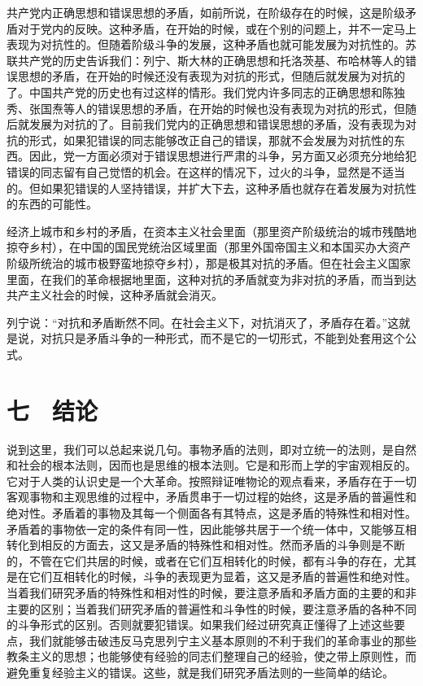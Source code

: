 共产党内正确思想和错误思想的矛盾，如前所说，在阶级存在的时候，这是阶级矛盾对于党内的反映。这种矛盾，在开始的时候，或在个别的问题上，并不一定马上表现为对抗性的。但随着阶级斗争的发展，这种矛盾也就可能发展为对抗性的。苏联共产党的历史告诉我们：列宁、斯大林的正确思想和托洛茨基、布哈林等人的错误思想的矛盾，在开始的时候还没有表现为对抗的形式，但随后就发展为对抗的了。中国共产党的历史也有过这样的情形。我们党内许多同志的正确思想和陈独秀、张国焘等人的错误思想的矛盾，在开始的时候也没有表现为对抗的形式，但随后就发展为对抗的了。目前我们党内的正确思想和错误思想的矛盾，没有表现为对抗的形式，如果犯错误的同志能够改正自己的错误，那就不会发展为对抗性的东西。因此，党一方面必须对于错误思想进行严肃的斗争，另方面又必须充分地给犯错误的同志留有自己觉悟的机会。在这样的情况下，过火的斗争，显然是不适当的。但如果犯错误的人坚持错误，并扩大下去，这种矛盾也就存在着发展为对抗性的东西的可能性。

经济上城市和乡村的矛盾，在资本主义社会里面（那里资产阶级统治的城市残酷地掠夺乡村），在中国的国民党统治区域里面（那里外国帝国主义和本国买办大资产阶级所统治的城市极野蛮地掠夺乡村），那是极其对抗的矛盾。但在社会主义国家里面，在我们的革命根据地里面，这种对抗的矛盾就变为非对抗的矛盾，而当到达共产主义社会的时候，这种矛盾就会消灭。

列宁说：“对抗和矛盾断然不同。在社会主义下，对抗消灭了，矛盾存在着。”这就是说，对抗只是矛盾斗争的一种形式，而不是它的一切形式，不能到处套用这个公式。

\section{七　结论}

说到这里，我们可以总起来说几句。事物矛盾的法则，即对立统一的法则，是自然和社会的根本法则，因而也是思维的根本法则。它是和形而上学的宇宙观相反的。它对于人类的认识史是一个大革命。按照辩证唯物论的观点看来，矛盾存在于一切客观事物和主观思维的过程中，矛盾贯串于一切过程的始终，这是矛盾的普遍性和绝对性。矛盾着的事物及其每一个侧面各有其特点，这是矛盾的特殊性和相对性。矛盾着的事物依一定的条件有同一性，因此能够共居于一个统一体中，又能够互相转化到相反的方面去，这又是矛盾的特殊性和相对性。然而矛盾的斗争则是不断的，不管在它们共居的时候，或者在它们互相转化的时候，都有斗争的存在，尤其是在它们互相转化的时候，斗争的表现更为显着，这又是矛盾的普遍性和绝对性。当着我们研究矛盾的特殊性和相对性的时候，要注意矛盾和矛盾方面的主要的和非主要的区别；当着我们研究矛盾的普遍性和斗争性的时候，要注意矛盾的各种不同的斗争形式的区别。否则就要犯错误。如果我们经过研究真正懂得了上述这些要点，我们就能够击破违反马克思列宁主义基本原则的不利于我们的革命事业的那些教条主义的思想；也能够使有经验的同志们整理自己的经验，使之带上原则性，而避免重复经验主义的错误。这些，就是我们研究矛盾法则的一些简单的结论。


